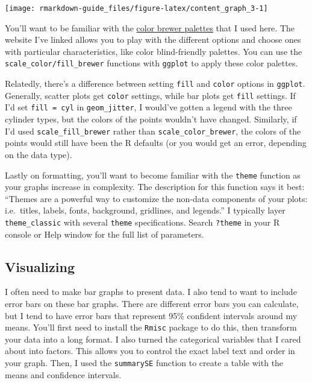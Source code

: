 \documentclass[
  openany]{book}
\begin{document}
\texttt{[image: rmarkdown-guide\_files/figure-latex/content\_graph\_3-1]}

You'll want to be familiar with the \href{https://colorbrewer2.org/}{color brewer palettes} that I used here. The website I've linked allows you to play with the different options and choose ones with particular characteristics, like color blind-friendly palettes. You can use the \texttt{scale\_color/fill\_brewer} functions with \texttt{ggplot} to apply these color palettes.

Relatedly, there's a difference between setting \texttt{fill} and \texttt{color} options in \texttt{ggplot}. Generally, scatter plots get \texttt{color} settings, while bar plots get \texttt{fill} settings. If I'd set \texttt{fill\ =\ cyl} in \texttt{geom\_jitter}, I would've gotten a legend with the three cylinder types, but the colors of the points wouldn't have changed. Similarly, if I'd used \texttt{scale\_fill\_brewer} rather than \texttt{scale\_color\_brewer}, the colors of the points would still have been the R defaults (or you would get an error, depending on the data type).

Lastly on formatting, you'll want to become familiar with the \texttt{theme} function as your graphs increase in complexity. The description for this function says it best: ``Themes are a powerful way to customize the non-data components of your plots: i.e.~titles, labels, fonts, background, gridlines, and legends.'' I typically layer \texttt{theme\_classic} with several \texttt{theme} specifications. Search \texttt{?theme} in your R console or Help window for the full list of parameters.

\hypertarget{visualizing}{%
\subsection{Visualizing}\label{visualizing}}

I often need to make bar graphs to present data. I also tend to want to include error bars on these bar graphs. There are different error bars you can calculate, but I tend to have error bars that represent 95\% confident intervals around my means. You'll first need to install the \texttt{Rmisc} package to do this, then transform your data into a long format. I also turned the categorical variables that I cared about into factors. This allows you to control the exact label text and order in your graph. Then, I used the \texttt{summarySE} function to create a table with the means and confidence intervals.
\end{document}
